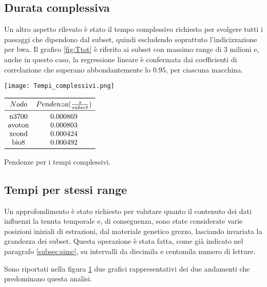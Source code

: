 \subsection{Durata complessiva}
Un altro aspetto rilevato è stato il tempo complessivo richiesto per svolgere tutti i passaggi che dipendono dal subset, quindi escludendo soprattuto l'indicizzazione per bwa.
Il grafico \ref{fig:Ttot} è riferito ai subset con massimo range di 3 milioni e, anche in questo caso, la regressione lineare è confermata dai coefficienti di correlazione che superano abbondantemente lo $0.95$, per ciascuna macchina.

\begin{table}[H]
  \begin{minipage}[b]{0.4\linewidth}
	\centering
	\texttt{[image: Tempi\_complessivi.png]}	
	\label{fig:Ttot}
  \end{minipage}
  \hfill  
  \begin{varwidth}[b]{0.4\linewidth}
    \centering
	$\begin{array}{*{2}{c}}
		\toprule
			Nodo & Pendenza(\frac{s}{subset})\\
		\midrule
			\text{n3700} & 0.000869 \\
			\text{avoton} & 0.000803 \\
			\text{xeond} & 0.000424 \\
			\text{bio8} & 0.000492 \\
		\bottomrule
	\end{array}$
    \caption{Pendenze per i tempi complessivi.}
    \label{tab:Ttot}
  \end{varwidth}%
\end{table}

\subsection{Tempi per stessi range}
Un approfondimento è stato richiesto per valutare quanto il contenuto dei dati influenzi la tenuta temporale e, di conseguenza, sono state considerate varie posizioni iniziali di estrazioni, dal materiale genetico grezzo, lasciando invariata la grandezza dei subset.
Questa operazione è stata fatta, come già indicato nel paragrafo \ref{subsec:simc}, su intervalli da diecimila e centomila numero di letture.

Sono riportati nella figura \ref{fig:Trng} due grafici rappresentativi dei due andamenti che predominano questa analisi.
\begin{figure}[H]
\centering
{} \quad
{} \\
\caption{}
\label{fig:Trng}
\end{figure}

